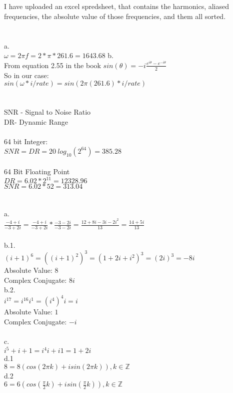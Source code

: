 \documentclass[11pt,leqno,fleqn]{article}
\begin{document}
\section{}
I have uploaded an excel spredsheet, that contains the harmonics, aliased frequencies, the absolute value of those frequencies, and them all sorted.
\section{}
a.\\
$\omega = 2 \pi f = 2 * \pi * 261.6 = 1643.68$
b.\\
From equation 2.55 in the book $sin(\theta) =-i \frac{e^{i \theta} - e^{-i \theta}}{2}$\\
So in our case:\\

$sin(\omega * i/rate) = sin(2 \pi (261.6) * i /rate)$
\section{}
SNR - Signal to Noise Ratio\\
DR- Dynamic Range\\
\\
64 bit Integer:\\
$SNR = DR = 20\ log_{10} (2^{64}) = 385.28$\\
\\
64 Bit Floating Point\\
$DR = 6.02 * 2^{11} = 12328.96$\\
$SNR = 6.02 * {52} = 313.04$\\
\section{}
a. \\
$\frac{-4 + i}{-3 +2i} = \frac{-4 + i}{-3 +2i} * \frac{-3 - 2i}{-3 - 2i}  = \frac{12 + 8i -3i -2i^2}{13} = \frac{14 + 5i}{13}$\\
\\
b.1.\\
$(i+1)^6 = ((i+1)^2)^3 = (1 + 2i + i^2)^3 = (2i)^3 = -8i$\\
Absolute Value: $8$\\
Complex Conjugate: $8i$\\
b.2.\\
$i^{17} = i^{16} i^1 = (i^4)^4i = i$\\
Absolute Value: $1$\\
Complex Conjugate: $-i$\\
\\
c.\\
$i^5 + i + 1 = i^4 i + i 1 = 1 + 2 i$\\
d.1\\
$8 =  8( cos(2 \pi k) + isin(2 \pi k) ) , k \in \mathbb{Z}$\\
d.2\\
$6 =  6( cos( \frac{\pi}{2}  k) + isin( \frac{\pi}{2} k) ) , k \in \mathbb{Z}$\\
\end{document}
